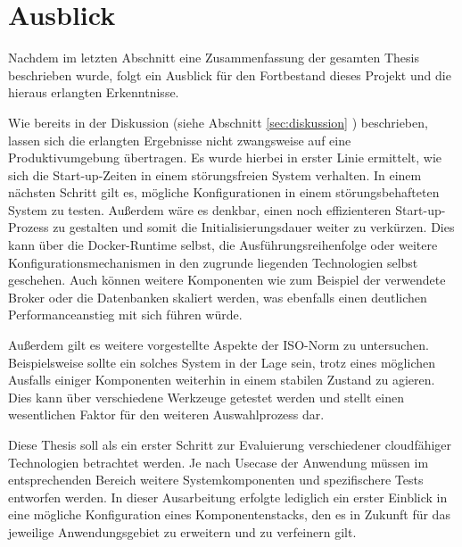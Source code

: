 \chapter{Ausblick}

Nachdem im letzten Abschnitt eine Zusammenfassung der gesamten Thesis beschrieben wurde, folgt ein Ausblick für den Fortbestand dieses Projekt und die hieraus erlangten Erkenntnisse.

Wie bereits in der Diskussion (siehe Abschnitt \ref{sec:diskussion} ) beschrieben, lassen sich die erlangten Ergebnisse nicht zwangsweise auf eine Produktivumgebung übertragen. Es wurde hierbei in erster Linie ermittelt, wie sich die Start-up-Zeiten in einem störungsfreien System verhalten. In einem nächsten Schritt gilt es, mögliche Konfigurationen in einem störungsbehafteten System zu testen. Außerdem wäre es denkbar, einen noch effizienteren Start-up-Prozess zu gestalten und somit die Initialisierungsdauer weiter zu verkürzen. Dies kann über die Docker-Runtime selbst, die Ausführungsreihenfolge oder weitere Konfigurationsmechanismen in den zugrunde liegenden Technologien selbst geschehen. Auch können weitere Komponenten wie zum Beispiel der verwendete Broker oder die Datenbanken skaliert werden, was ebenfalls einen deutlichen Performanceanstieg mit sich führen würde.

Außerdem gilt es weitere vorgestellte Aspekte der ISO-Norm zu untersuchen. Beispielsweise sollte ein solches System in der Lage sein, trotz eines möglichen Ausfalls einiger Komponenten weiterhin in einem stabilen Zustand zu agieren. Dies kann über verschiedene Werkzeuge getestet werden und stellt einen wesentlichen Faktor für den weiteren Auswahlprozess dar. 

Diese Thesis soll als ein erster Schritt zur Evaluierung verschiedener cloudfähiger Technologien betrachtet werden. Je nach Usecase der Anwendung müssen im entsprechenden Bereich weitere Systemkomponenten und spezifischere Tests entworfen werden. In dieser Ausarbeitung erfolgte lediglich ein erster Einblick in eine mögliche Konfiguration eines Komponentenstacks, den es in Zukunft für das jeweilige Anwendungsgebiet zu erweitern und zu verfeinern gilt.
